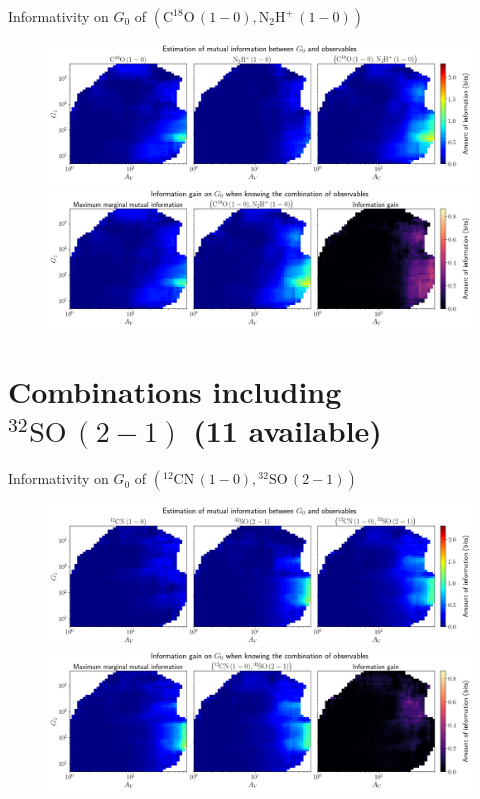 \documentclass{beamer}
\begin{document}
\begin{frame}{Informativity on $G_0$ of $\left(\mathrm{C^{18}O\,(1-0)},\mathrm{N_2H^+\,(1-0)}\right)$}
    \begin{figure}
        \centering
        \includegraphics[width=0.95\linewidth]{../mi/g0__c18o10_n2hp10_mi.png}
        \vfill
        \includegraphics[width=0.95\linewidth]{../mi/g0__c18o10_n2hp10_mi_gain.png}
    \end{figure}
\end{frame}

\section{Combinations including $\mathrm{^{32}SO\,(2-1)}$ (11 available)}

\begin{frame}{Informativity on $G_0$ of $\left(\mathrm{^{12}CN\,(1-0)},\mathrm{^{32}SO\,(2-1)}\right)$}
    \begin{figure}
        \centering
        \includegraphics[width=0.95\linewidth]{../mi/g0__12cn10_32so21_mi.png}
        \vfill
        \includegraphics[width=0.95\linewidth]{../mi/g0__12cn10_32so21_mi_gain.png}
    \end{figure}
\end{frame}
\end{document}
